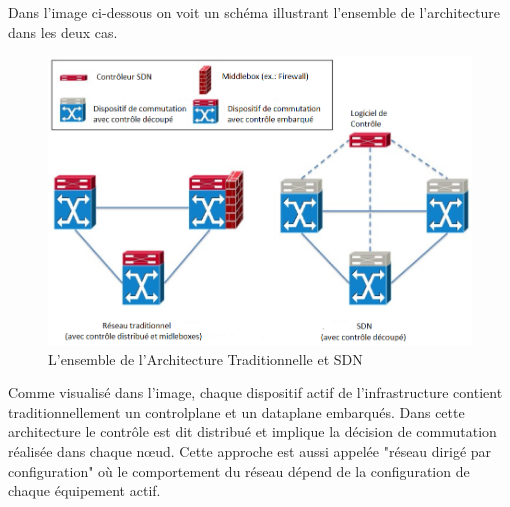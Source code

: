 Dans l'image ci-dessous on voit un schéma illustrant l'ensemble de l'architecture dans les deux cas.




\begin{figure}[!h] %
\includegraphics[width=15cm]{images/TraditionalVsSDN.png} %
\caption{ L'ensemble de l'Architecture Traditionnelle et SDN \cite{SurveySDNArchi}} %
\label{imgOverviewArchi} %
\end{figure} %


Comme visualisé dans l'image, chaque dispositif actif de l'infrastructure contient traditionnellement un \gls{controlplane} et un \gls{dataplane} embarqués. Dans cette architecture le contrôle est dit distribué et implique la décision de commutation réalisée dans chaque nœud. Cette approche est aussi appelée "réseau dirigé par configuration" où le comportement du réseau dépend de la configuration de chaque équipement actif. 


